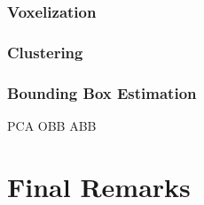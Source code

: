 
\subsubsection{Voxelization}

\subsubsection{Clustering}

\subsubsection{Bounding Box Estimation}

PCA
OBB
ABB

\section{Final Remarks}









